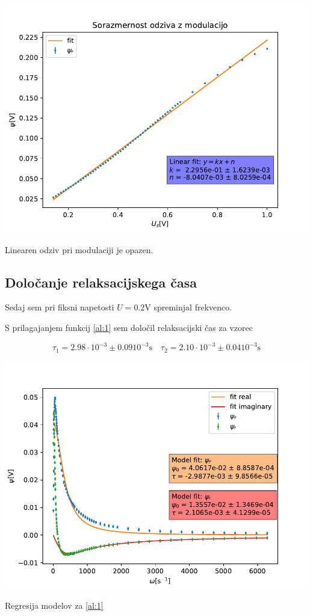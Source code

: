 \documentclass[11pt]{article}
\renewcommand{%
  \refname}{Viri}
\begin{document}
\begin{slika}[H]
\begin{center}
\includegraphics[width=.9\linewidth]{figures/modulacija.pdf}
\end{center}
\caption{\small Linearen odziv pri modulaciji je opazen. }\label{slika:1}
\end{slika}
\subsection{Določanje relaksacijskega časa}\label{sec:org628c203}

Sedaj sem pri fiksni napetosti \(U = 0.2 \mathrm{V}\) spreminjal frekvenco.

S prilagajanjem funkcij \ref{al:1} sem določil relaksacijski čas za vzorec

\[ \tau_1 = 2.98 \cdot 10^{-3} \pm 0.09 10^{-3} \mathrm{s} \quad \tau_2 = 2.10 \cdot 10^{-3} \pm 0.04 10^{-3} \mathrm{s}
\]

\begin{slika}[H]
  \begin{center}
    \includegraphics[width=.9\linewidth]{figures/fit_modelov}
  \end{center}
  \caption{\small Regresija modelov za \ref{al:1}}
\end{slika}
\end{document}
